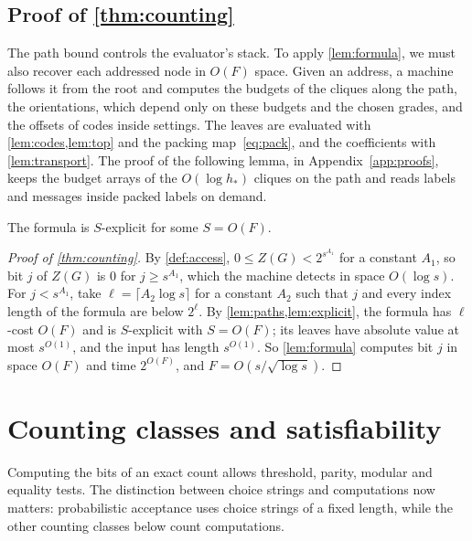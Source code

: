 \documentclass[11pt]{article}
\theoremstyle{definition}
\theoremstyle{definition}
\theoremstyle{remark}
\begin{document}
\subsection{Proof of \texorpdfstring{\cref{thm:counting}}{the counting theorem}}

The path bound controls the evaluator's stack. To apply \cref{lem:formula}, we must also recover each addressed node in $O(F)$ space. Given an address, a machine follows it from the root and computes the budgets of the cliques along the path, the orientations, which depend only on these budgets and the chosen grades, and the offsets of codes inside settings. The leaves are evaluated with \cref{lem:codes,lem:top} and the packing map~\eqref{eq:pack}, and the coefficients with \cref{lem:transport}. The proof of the following lemma, in Appendix~\ref{app:proofs}, keeps the budget arrays of the $O(\log h_*)$ cliques on the path and reads labels and messages inside packed labels on demand.

\begin{lemma}\label{lem:explicit}
The formula is $S$-explicit for some $S=O(F)$.
\end{lemma}

\begin{proof}[Proof of \cref{thm:counting}]
By \cref{def:access}, $0\le Z(G)<2^{s^{A_1}}$ for a constant $A_1$, so bit $j$ of $Z(G)$ is $0$ for $j\ge s^{A_1}$, which the machine detects in space $O(\log s)$. For $j<s^{A_1}$, take $\ell=\lceil A_2\log s\rceil$ for a constant $A_2$ such that $j$ and every index length of the formula are below $2^\ell$. By \cref{lem:paths,lem:explicit}, the formula has $\ell$-cost $O(F)$ and is $S$-explicit with $S=O(F)$; its leaves have absolute value at most $s^{O(1)}$, and the input has length $s^{O(1)}$. So \cref{lem:formula} computes bit $j$ in space $O(F)$ and time $2^{O(F)}$, and $F=O(s/\sqrt{\log s})$.
\end{proof}

\section{Counting classes and satisfiability}\label{sec:consequences}

Computing the bits of an exact count allows threshold, parity, modular and equality tests. The distinction between choice strings and computations now matters: probabilistic acceptance uses choice strings of a fixed length, while the other counting classes below count computations.
\end{document}
